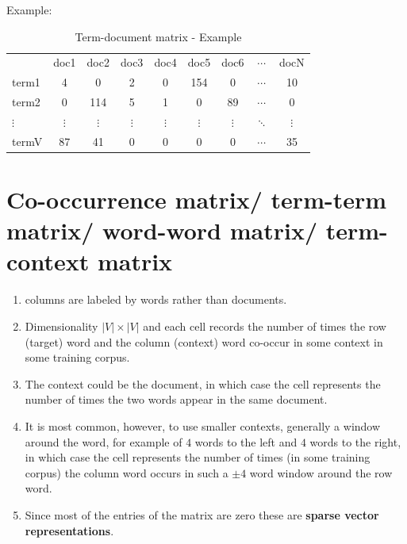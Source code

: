 Example:
\begin{table}[h]
    \centering
    \begin{tabular}{l c c c c c c c c}
         & doc1 & doc2 & doc3 & doc4 & doc5 & doc6 & $\cdots$ & docN \\
        term1 & 4 & 0 & 2 & 0 & 154 & 0 & $\cdots$ & 10 \\ 
        term2 & 0 & 114 & 5 & 1 & 0 & 89 & $\cdots$ & 0 \\ 
        $\vdots$ & $\vdots$ & $\vdots$ & $\vdots$ & $\vdots$ & $\vdots$ & $\vdots$ & $\ddots$ & $\vdots$ \\
        termV & 87 & 41 & 0 & 0 & 0 & 0 & $\cdots$ & 35 \\ 
    \end{tabular}
    \caption{Term-document matrix - Example}
\end{table}


\section{Co-occurrence matrix/ term-term matrix/ word-word matrix/ term-context matrix \cite{nlp-1}}\label{Co-occurrence matrix/ term-term matrix/ word-word matrix/ term-context matrix}

\begin{enumerate}
    \item columns are labeled by words rather than documents. 
    
    \item Dimensionality $|V|\times|V|$ and each cell records the number of times the row (target) word and the column (context) word co-occur in some context in some training corpus.

    \item The context could be the document, in which case the cell represents the number of times the two words appear in the same document.

    \item It is most common, however, to use smaller contexts, generally a window around the word, for example of $4$ words to the left and $4$ words to the right, in which case the cell represents the number of times (in some training corpus) the column word occurs in such a $\pm 4$ word window around the row word.

    \item Since most of the entries of the matrix are zero these are \textbf{sparse vector representations}.
\end{enumerate}

